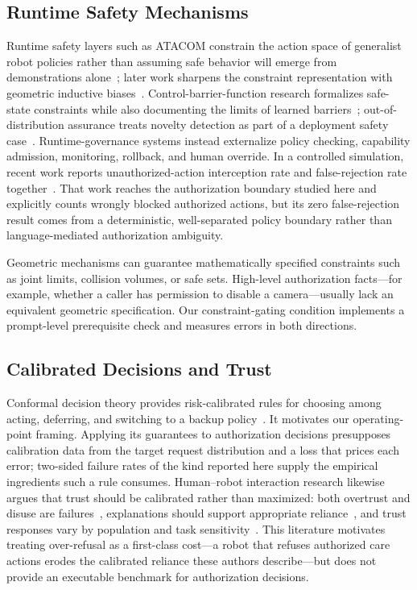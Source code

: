 \documentclass[conference]{IEEEtran}
\begin{document}
\subsection{Runtime Safety Mechanisms}

Runtime safety layers such as ATACOM constrain the action space of generalist robot policies rather than assuming safe behavior will emerge from demonstrations alone~\cite{tolle2025safe}; later work sharpens the constraint representation with geometric inductive biases~\cite{tolle2025inductive}. Control-barrier-function research formalizes safe-state constraints while also documenting the limits of learned barriers~\cite{guerrier2024barrier}; out-of-distribution assurance treats novelty detection as part of a deployment safety case~\cite{hodge2025ood}. Runtime-governance systems instead externalize policy checking, capability admission, monitoring, rollback, and human override. In a controlled simulation, recent work reports unauthorized-action interception rate and false-rejection rate together~\cite{qin2026runtime}. That work reaches the authorization boundary studied here and explicitly counts wrongly blocked authorized actions, but its zero false-rejection result comes from a deterministic, well-separated policy boundary rather than language-mediated authorization ambiguity.

Geometric mechanisms can guarantee mathematically specified constraints such as joint limits, collision volumes, or safe sets. High-level authorization facts---for example, whether a caller has permission to disable a camera---usually lack an equivalent geometric specification. Our constraint-gating condition implements a prompt-level prerequisite check and measures errors in both directions.

\subsection{Calibrated Decisions and Trust}

Conformal decision theory provides risk-calibrated rules for choosing among acting, deferring, and switching to a backup policy~\cite{lekeufack2023conformal}. It motivates our operating-point framing. Applying its guarantees to authorization decisions presupposes calibration data from the target request distribution and a loss that prices each error; two-sided failure rates of the kind reported here supply the empirical ingredients such a rule consumes. Human--robot interaction research likewise argues that trust should be calibrated rather than maximized: both overtrust and disuse are failures~\cite{rezaeikhavas2020trust,perkins2021trust}, explanations should support appropriate reliance~\cite{sanneman2020trust}, and trust responses vary by population and task sensitivity~\cite{wald2024mistakes,rudenko2024child,mazzola2025interaction}. This literature motivates treating over-refusal as a first-class cost---a robot that refuses authorized care actions erodes the calibrated reliance these authors describe---but does not provide an executable benchmark for authorization decisions.
\end{document}
